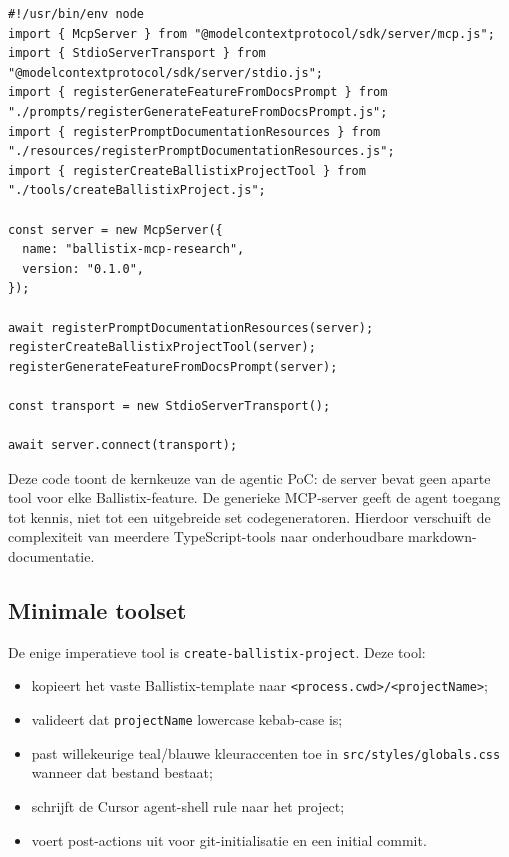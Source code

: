 \begin{verbatim}
#!/usr/bin/env node
import { McpServer } from "@modelcontextprotocol/sdk/server/mcp.js";
import { StdioServerTransport } from "@modelcontextprotocol/sdk/server/stdio.js";
import { registerGenerateFeatureFromDocsPrompt } from "./prompts/registerGenerateFeatureFromDocsPrompt.js";
import { registerPromptDocumentationResources } from "./resources/registerPromptDocumentationResources.js";
import { registerCreateBallistixProjectTool } from "./tools/createBallistixProject.js";

const server = new McpServer({
  name: "ballistix-mcp-research",
  version: "0.1.0",
});

await registerPromptDocumentationResources(server);
registerCreateBallistixProjectTool(server);
registerGenerateFeatureFromDocsPrompt(server);

const transport = new StdioServerTransport();

await server.connect(transport);
\end{verbatim}

\noindent
Deze code toont de kernkeuze van de agentic PoC: de server bevat geen aparte tool voor elke Ballistix-feature. De generieke MCP-server geeft de agent toegang tot kennis, niet tot een uitgebreide set codegeneratoren. Hierdoor verschuift de complexiteit van meerdere TypeScript-tools naar onderhoudbare markdown-documentatie.

\subsection{Minimale toolset}

De enige imperatieve tool is \texttt{create-ballistix-project}. Deze tool:

\begin{itemize}
  \item kopieert het vaste Ballistix-template naar \texttt{<process.cwd>/<projectName>};
  \item valideert dat \texttt{projectName} lowercase kebab-case is;
  \item past willekeurige teal/blauwe kleuraccenten toe in \texttt{src/styles/globals.css} wanneer dat bestand bestaat;
  \item schrijft de Cursor agent-shell rule naar het project;
  \item voert post-actions uit voor git-initialisatie en een initial commit.
\end{itemize}

